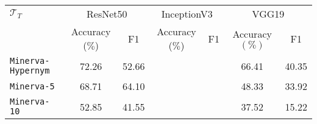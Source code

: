 \begin{tabular}{l|cc|cc|cc} \hline
	$\mathcal{T}_T$ &  \multicolumn{2}{c}{ResNet50} & \multicolumn{2}{|c|}{InceptionV3} & \multicolumn{2}{c}{VGG19}\\
			& Accuracy ($\%$) & F1 & Accuracy ($\%$) & F1 & Accuracy $(\%)$ & F1 \\\hline \hline
	\texttt{Minerva-Hypernym} & 72.26 & 52.66 & \cellcolor{green!25}{75.80} & \cellcolor{green!25}{57.03} & 66.41 & 40.35 \\
	\texttt{Minerva-5} & 68.71  & 64.10 & \cellcolor{green!25}{73.66} & \cellcolor{green!25}{70.29} & 48.33 & 33.92\\
	\texttt{Minerva-10} & 52.85 & 41.55  & \cellcolor{green!25}{55.51} & \cellcolor{green!25}{44.77} & 37.52 & 15.22 \\
\hline
\end{tabular}
